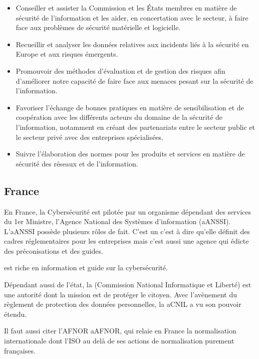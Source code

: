 \begin{itemize}
  \item Conseiller et assister la Commission et les États membres en matière de sécurité de l'information et les aider, en concertation avec le secteur, à faire face aux problèmes de sécurité matérielle et logicielle.
  \item Recueillir et analyser les données relatives aux incidents liés à la sécurité en Europe et aux risques émergents.
  \item Promouvoir des méthodes d'évaluation et de gestion des risques afin d'améliorer notre capacité de faire face aux menaces pesant sur la sécurité de l'information.
  \item Favoriser l'échange de bonnes pratiques en matière de sensibilisation et de coopération avec les différents acteurs du domaine de la sécurité de l'information, notamment en créant des partenariats entre le secteur public et le secteur privé avec des entreprises spécialisées.
  \item Suivre l'élaboration des normes pour les produits et services en matière de sécurité des réseaux et de l'information.
\end{itemize}

\subsection{France}

En France, la Cybersécurité est pilotée par un organisme dépendant des services du 1er Ministre,  l'Agence National des Systèmes d'information (\gls{aANSSI}).
L'\gls{aANSSI} possède plusieurs rôles de fait. C'est un  c'est à dire qu'elle définit des cadres réglementaires pour les entreprises mais c'est aussi une agence qui édicte des préconisations et des guides.

  est riche en information et guide sur la cybersécurité.

Dépendant aussi de l'état, la  (Commission National Informatique et Liberté) est une autorité dont la mission est de protéger le citoyen. Avec l'avènement du règlement de protection des données personnelles, la \gls{aCNIL} a vu son pouvoir étendu.  

Il faut aussi citer l'AFNOR \gls{aAFNOR}, qui relaie en France la normalisation internationale dont l'ISO au delà de ses actions de normalisation purement françaises.

